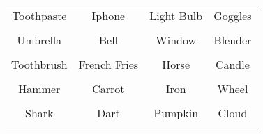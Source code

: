 \documentclass[12pt,a4paper]{article}
\begin{document}
\thispagestyle{empty}
\begin{table}[]
\centering
\Huge
\begin{tabular}{cccc}
 Toothpaste& Iphone& Light Bulb& Goggles\\  & & & \\
 Umbrella& Bell& Window& Blender\\  & & & \\
 Toothbrush& French Fries& Horse& Candle\\  & & & \\
 Hammer& Carrot& Iron& Wheel\\  & & & \\
 Shark& Dart& Pumpkin& Cloud\\  & & & \\
\end{tabular}
\end{table}
\end{document}
